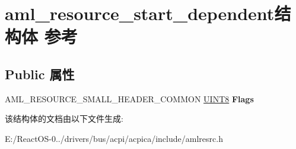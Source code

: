 \hypertarget{structaml__resource__start__dependent}{}\section{aml\+\_\+resource\+\_\+start\+\_\+dependent结构体 参考}
\label{structaml__resource__start__dependent}
\subsection*{Public 属性}
\begin{DoxyCompactItemize}
\item 
\mbox{\label{structaml__resource__start__dependent_a7f13704d1da53384522f3f5a6b69132c}} 
A\+M\+L\+\_\+\+R\+E\+S\+O\+U\+R\+C\+E\+\_\+\+S\+M\+A\+L\+L\+\_\+\+H\+E\+A\+D\+E\+R\+\_\+\+C\+O\+M\+M\+ON \hyperlink{_processor_bind_8h_ab27e9918b538ce9d8ca692479b375b6a}{U\+I\+N\+T8} {\bfseries Flags}
\end{DoxyCompactItemize}


该结构体的文档由以下文件生成\+:\begin{DoxyCompactItemize}
\item 
E\+:/\+React\+O\+S-\/0../drivers/bus/acpi/acpica/include/amlresrc.\+h\end{DoxyCompactItemize}
